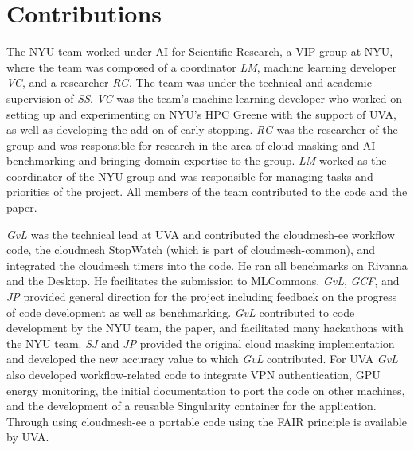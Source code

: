 \documentclass[sigplan,screen]{acmart}
\begin{document}





\section*{Contributions}

The NYU team worked under AI for Scientific Research, a VIP group at NYU, where the team was composed of a coordinator {\em LM}, machine learning developer {\em VC}, and a researcher {\em RG}. The team was under the technical and academic supervision of {\em SS}. {\em VC} was the team’s machine learning developer who worked on setting up and experimenting on NYU’s HPC Greene with the support of UVA, as well as developing the add-on of early stopping. {\em RG} was the researcher of the group and was responsible for research in the area of cloud masking and AI benchmarking and bringing domain expertise to the group. {\em LM}  worked as the coordinator of the NYU group and was responsible for managing tasks and priorities of the project. All members of the team contributed to the code and the paper.

{\em GvL} was the technical lead at UVA and contributed the cloudmesh-ee workflow code, the cloudmesh StopWatch (which is part of cloudmesh-common), and integrated the cloudmesh timers into the code. He ran all benchmarks on Rivanna and the Desktop.  He facilitates the submission to MLCommons. {\em GvL}, {\em GCF}, and {\em JP} provided general direction for the project including feedback on the progress of code development as well as benchmarking. {\em GvL} contributed to code development by the NYU team, the paper, and facilitated many hackathons with the NYU team. {\em SJ} and {\em JP} provided the original cloud masking implementation and developed the new accuracy value to which {\em GvL} contributed. For UVA {\em GvL} also developed workflow-related code to integrate VPN authentication, GPU energy monitoring, the initial documentation to port the code on other machines, and the development of a reusable Singularity container for the application. Through using cloudmesh-ee a portable code using the FAIR principle is available by UVA.
\end{document}
